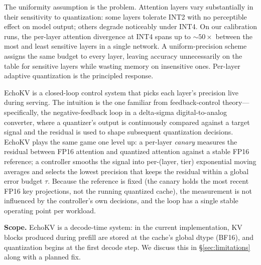 \documentclass{article}
\begin{document}
The uniformity assumption is the problem. Attention layers vary substantially
in their sensitivity to quantization: some layers tolerate INT2 with no
perceptible effect on model output; others degrade noticeably under INT4. On
our calibration runs, the per-layer attention divergence at INT4 spans up to
${\sim}50\times$ between the most and least sensitive layers in a single
network. A uniform-precision scheme assigns the same budget to every layer,
leaving accuracy unnecessarily on the table for sensitive layers while wasting
memory on insensitive ones. Per-layer adaptive quantization is the principled
response.

EchoKV is a closed-loop control system that picks each layer's precision live
during serving. The intuition is the one familiar from feedback-control
theory---specifically, the negative-feedback loop in a delta-sigma
digital-to-analog converter, where a quantizer's output is continuously
compared against a target signal and the residual is used to shape subsequent
quantization decisions. EchoKV plays the same game one level up: a per-layer
\emph{canary} measures the residual between FP16 attention and quantized
attention against a stable FP16 reference; a controller smooths the signal
into per-(layer, tier) exponential moving averages and selects the lowest
precision that keeps the residual within a global error budget $\tau$. Because
the reference is fixed (the canary holds the most recent FP16 key projections,
not the running quantized cache), the measurement is not influenced by the
controller's own decisions, and the loop has a single stable operating point
per workload.

\textbf{Scope.} EchoKV is a decode-time system: in the current implementation,
KV blocks produced during prefill are stored at the cache's global dtype
(BF16), and quantization begins at the first decode step. We discuss this in
\S\ref{sec:limitations} along with a planned fix.
\end{document}
